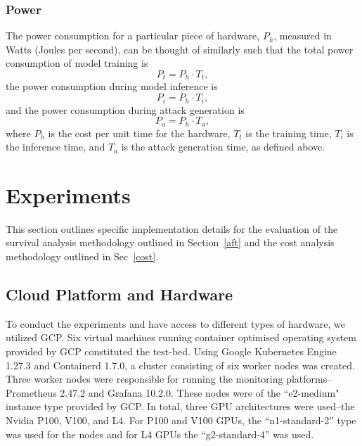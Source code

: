 \documentclass[conference]{IEEEtran}
\begin{document}
{\subsubsection{Power}

The power consumption for a particular piece of hardware, $P_h$, measured in Watts (Joules per second), can be thought of similarly such that the total power consumption of model training is
$$
    P_t = P_h \cdot T_t,
    \label{eq:power_training}
$$
the power consumption during model inference is
$$
    P_i = P_h \cdot T_i,
    \label{eq:power_inference}
$$
and the power consumption during attack generation is
$$
    P_a = P_h \cdot T_a,
    \label{eq:power_attack}
$$
where $P_h$ is the cost per unit time for the hardware, $T_t$ is the training time, $T_i$ is the inference time, and $T_a$ is the attack generation time, as defined above.





\section{Experiments}
\label{experiments}

This section outlines specific implementation details for the evaluation of the survival analysis methodology outlined in Section~\ref{aft} and the cost analysis methodology outlined in Sec~\ref{cost}.


\subsection{Cloud Platform and Hardware}
To conduct the experiments and have access to different types of hardware, we utilized GCP. Six virtual machines running container optimised operating system provided by GCP constituted the test-bed. Using Google Kubernetes Engine 1.27.3 and Containerd 1.7.0, a cluster consisting of six worker nodes was created. Three worker nodes were responsible for running the monitoring platforms-- Prometheus 2.47.2 and Grafana 10.2.0. These nodes were of the ``e2-medium" instance type provided by GCP. In total, three GPU architectures were used--the Nvidia P100, V100, and L4. For P100 and V100 GPUs, the ``n1-standard-2'' type was used for the nodes and for L4 GPUs the ``g2-standard-4'' was used.

}
\end{document}
